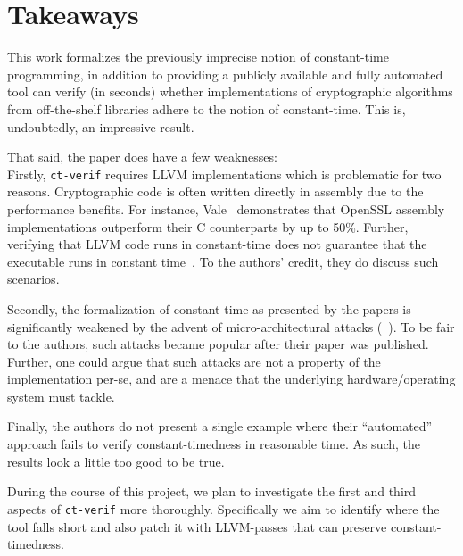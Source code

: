 \section{Takeaways}

This work formalizes the previously imprecise notion of constant-time programming, in addition to providing a publicly available and fully automated tool can verify (in seconds) whether implementations of cryptographic algorithms from off-the-shelf libraries adhere to the notion of constant-time. 
This is, undoubtedly, an impressive result.

That said, the paper does have a few weaknesses: \\
\indent Firstly, \texttt{ct-verif} requires LLVM implementations which is problematic for two reasons.
Cryptographic code is often written directly in assembly due to the performance benefits. For instance, Vale~\cite{vale} demonstrates that OpenSSL assembly implementations outperform their C counterparts by up to 50\%.
Further, verifying that LLVM code runs in constant-time does not guarantee that the executable runs in constant time~\cite{KaufmannPVV16}. To the authors' credit, they do discuss such scenarios.

Secondly, the formalization of constant-time as presented by the papers is significantly weakened by the advent of micro-architectural attacks (~\cite{meltdown,spectre}). To be fair to the authors, such attacks became popular after their paper was published. Further, one could argue that such attacks are not a property of the implementation per-se, and are a menace that the underlying hardware/operating system must tackle.

Finally, the authors do not present a single example where their ``automated'' approach fails to verify constant-timedness in reasonable time. As such, the results look a little too good to be true. 

During the course of this project, we plan to investigate the first and third aspects of \texttt{ct-verif} more thoroughly. 
Specifically we aim to identify where the tool falls short and also patch it with LLVM-passes that can preserve constant-timedness. 